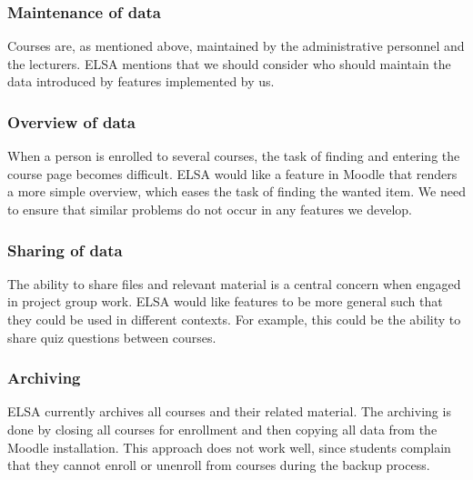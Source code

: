\subsubsection{Maintenance of data} Courses are, as mentioned above, maintained by the administrative personnel and the lecturers.
ELSA mentions that we should consider who should maintain the data introduced by features implemented by us.


\subsubsection{Overview of data} When a person is enrolled to several courses, the task of finding and entering the course page becomes difficult. 
ELSA would like a feature in Moodle that renders a more simple overview, which eases the task of finding the wanted item.
We need to ensure that similar problems do not occur in any features we develop.

\subsubsection{Sharing of data} The ability to share files and relevant material is a central concern when engaged in project group work.
ELSA would like features to be more general such that they could be used in different contexts.
For example, this could be the ability to share quiz questions between courses. 

\subsubsection{Archiving} ELSA currently archives all courses and their related material. 
The archiving is done by closing all courses for enrollment and then copying all data from the Moodle installation. 
This approach does not work well, since students complain that they cannot enroll or unenroll from courses during the backup process. 

